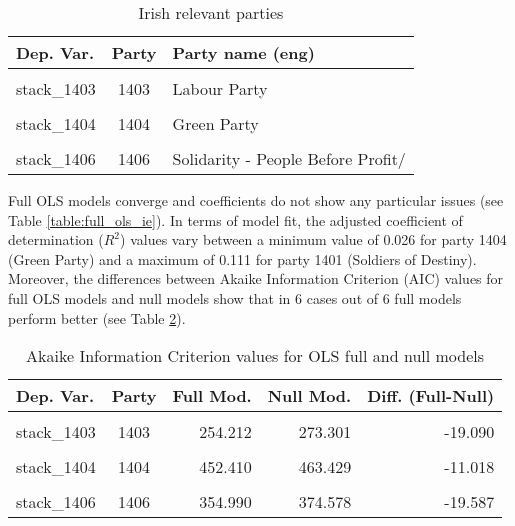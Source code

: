 \documentclass[
]{article}
\begin{document}
\begin{table}[!h]

\caption{\label{tab:unnamed-chunk-89}Irish relevant parties \label{table:relprty_tab_ie}}
\centering
\begin{tabular}[t]{lcl}
\toprule
Dep. Var. & Party & Party name (eng)\\
\midrule
\cellcolor{gray!6}{stack\_1402} & \cellcolor{gray!6}{1402} & \cellcolor{gray!6}{Familiy of the Irish}\\
stack\_1403 & 1403 & Labour Party\\
\cellcolor{gray!6}{stack\_1401} & \cellcolor{gray!6}{1401} & \cellcolor{gray!6}{Soldiers of Destiny}\\
stack\_1404 & 1404 & Green Party\\
\cellcolor{gray!6}{stack\_1405} & \cellcolor{gray!6}{1405} & \cellcolor{gray!6}{Ourselves Alone}\\
\addlinespace
stack\_1406 & 1406 & Solidarity - People Before Profit/\\
\bottomrule
\end{tabular}
\end{table}

Full OLS models converge and coefficients do not show any particular issues (see Table
\ref{table:full_ols_ie}).
In terms of model fit, the adjusted coefficient of determination (\(R^2\)) values vary between
a minimum value of 0.026
for party 1404
(Green Party)
and a maximum of 0.111
for party 1401
(Soldiers of Destiny).
Moreover, the differences between Akaike Information Criterion (AIC) values for full OLS models and null
models show that in 6 cases out of 6 full models perform better (see Table
\ref{table:ols_aic_ie}).

\begin{table}[!h]

\caption{\label{tab:unnamed-chunk-90}Akaike Information Criterion values for OLS full and null models 
        \label{table:ols_aic_ie}}
\centering
\begin{tabular}[t]{lcrrr}
\toprule
Dep. Var. & Party & Full Mod. & Null Mod. & Diff. (Full-Null)\\
\midrule
\cellcolor{gray!6}{stack\_1402} & \cellcolor{gray!6}{1402} & \cellcolor{gray!6}{482.194} & \cellcolor{gray!6}{542.391} & \cellcolor{gray!6}{-60.197}\\
stack\_1403 & 1403 & 254.212 & 273.301 & -19.090\\
\cellcolor{gray!6}{stack\_1401} & \cellcolor{gray!6}{1401} & \cellcolor{gray!6}{405.420} & \cellcolor{gray!6}{494.195} & \cellcolor{gray!6}{-88.775}\\
stack\_1404 & 1404 & 452.410 & 463.429 & -11.018\\
\cellcolor{gray!6}{stack\_1405} & \cellcolor{gray!6}{1405} & \cellcolor{gray!6}{419.079} & \cellcolor{gray!6}{482.320} & \cellcolor{gray!6}{-63.242}\\
\addlinespace
stack\_1406 & 1406 & 354.990 & 374.578 & -19.587\\
\bottomrule
\end{tabular}
\end{table}
\end{document}
